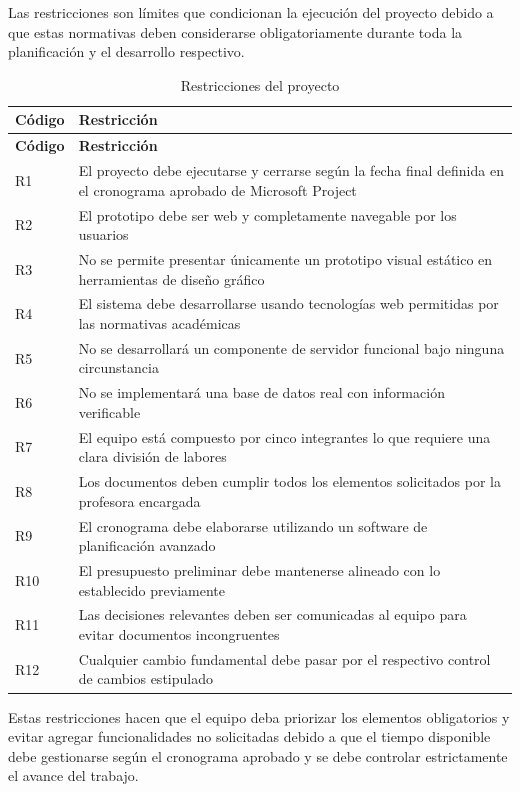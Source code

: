 \documentclass[11pt,spanish]{article}
\begin{document}
Las restricciones son límites que condicionan la ejecución del proyecto debido a que estas normativas deben considerarse obligatoriamente durante toda la planificación y el desarrollo respectivo.

\begin{longtable}{L{2cm} L{12.4cm}}
\caption{Restricciones del proyecto}\label{tab:restricciones}\\[-0.5em]
\toprule
\textbf{Código} & \textbf{Restricción} \\
\midrule
\endfirsthead
\toprule
\textbf{Código} & \textbf{Restricción} \\
\midrule
\endhead
R1 & El proyecto debe ejecutarse y cerrarse según la fecha final definida en el cronograma aprobado de Microsoft Project \\
R2 & El prototipo debe ser web y completamente navegable por los usuarios \\
R3 & No se permite presentar únicamente un prototipo visual estático en herramientas de diseño gráfico \\
R4 & El sistema debe desarrollarse usando tecnologías web permitidas por las normativas académicas \\
R5 & No se desarrollará un componente de servidor funcional bajo ninguna circunstancia \\
R6 & No se implementará una base de datos real con información verificable \\
R7 & El equipo está compuesto por cinco integrantes lo que requiere una clara división de labores \\
R8 & Los documentos deben cumplir todos los elementos solicitados por la profesora encargada \\
R9 & El cronograma debe elaborarse utilizando un software de planificación avanzado \\
R10 & El presupuesto preliminar debe mantenerse alineado con lo establecido previamente \\
R11 & Las decisiones relevantes deben ser comunicadas al equipo para evitar documentos incongruentes \\
R12 & Cualquier cambio fundamental debe pasar por el respectivo control de cambios estipulado \\
\bottomrule
\end{longtable}

Estas restricciones hacen que el equipo deba priorizar los elementos obligatorios y evitar agregar funcionalidades no solicitadas debido a que el tiempo disponible debe gestionarse según el cronograma aprobado y se debe controlar estrictamente el avance del trabajo.
\end{document}
